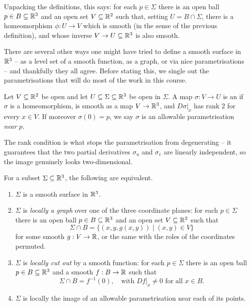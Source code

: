 \documentclass[a4paper]{scrartcl}
\begin{document}
Unpacking the definitions, this says: for each $p \in \Sigma$ there is an open ball $p \in B \subseteq \mathbb{R}^3$ and an open set $V \subseteq \mathbb{R}^2$ such that, setting $U = B \cap \Sigma$, there is a homeomorphism $\phi: U \rightarrow V$ which is smooth (in the sense of the previous definition), and whose inverse $V \rightarrow U \subseteq \mathbb{R}^3$ is also smooth.

There are several other ways one might have tried to define a smooth surface in $\mathbb{R}^3$ -- as a level set of a smooth function, as a graph, or via nice parametrisations -- and thankfully they all agree. Before stating this, we single out the parametrisations that will do most of the work in this course.

\begin{definition}
    Let $V \subseteq \mathbb{R}^2$ be open and let $U \subseteq \Sigma \subseteq \mathbb{R}^3$ be open in $\Sigma$. A map $\sigma: V \rightarrow U$ is an  if $\sigma$ is a homeomorphism, is smooth as a map $V \rightarrow \mathbb{R}^3$, and $\left.D\sigma\right|_x$ has rank $2$ for every $x \in V$.
    If moreover $\sigma(0) = p$, we say $\sigma$ is an allowable parametrisation \emph{near} $p$.
\end{definition}

The rank condition is what stops the parametrisation from degenerating -- it guarantees that the two partial derivatives $\sigma_u$ and $\sigma_v$ are linearly independent, so the image genuinely looks two-dimensional.

\begin{theorem}\label{thm:smoothsurfacechar}
    For a subset $\Sigma \subseteq \mathbb{R}^3$, the following are equivalent.
    \begin{enumerate}[label=(\roman*)]
        \item $\Sigma$ is a smooth surface in $\mathbb{R}^3$.
        \item $\Sigma$ is \emph{locally a graph} over one of the three coordinate planes: for each $p \in \Sigma$ there is an open ball $p \in B \subseteq \mathbb{R}^3$ and an open set $V \subseteq \mathbb{R}^2$ such that
        $$
        \Sigma \cap B = \{(x, y, g(x, y)) \mid (x,y) \in V\}
        $$
        for some smooth $g : V \rightarrow \mathbb{R}$, or the same with the roles of the coordinates permuted.
        \item $\Sigma$ is \emph{locally cut out} by a smooth function: for each $p \in \Sigma$ there is an open ball $p \in B \subseteq \mathbb{R}^3$ and a smooth $f: B \rightarrow \mathbb{R}$ such that
        $$
        \Sigma \cap B = f^{-1}(0), \quad \text{with } \left.Df\right|_x \neq 0 \text{ for all } x \in B.
        $$
        \item $\Sigma$ is locally the image of an allowable parametrisation near each of its points.
    \end{enumerate}
\end{theorem}
\end{document}
